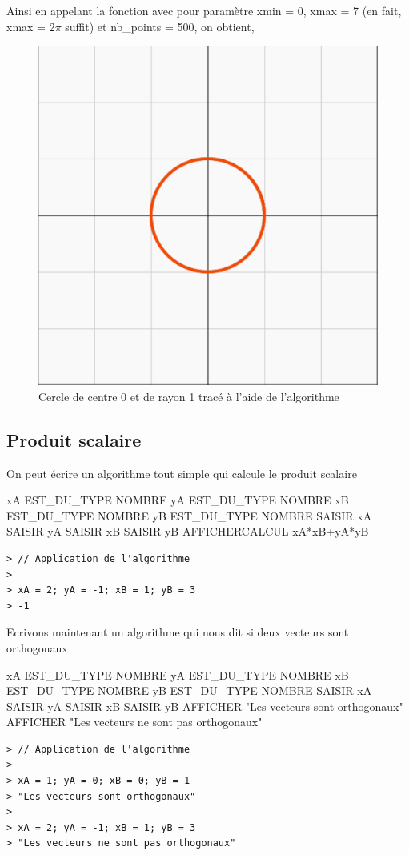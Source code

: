 Ainsi en appelant la fonction avec pour paramètre xmin = 0, xmax = 7 (en fait, xmax = 2$\pi$ suffit) et nb\_points = 500, on obtient, 
\begin{figure}[H]
\centering
\includegraphics[scale=0.5]{images/cercle_trigo.png}
\caption{Cercle de centre 0 et de rayon 1 tracé à l'aide de l'algorithme}
\end{figure}
\subsection{Produit scalaire}
On peut écrire un algorithme tout simple qui calcule le produit scalaire
\begin{algobox}
\Variables
\Ligne xA EST\_DU\_TYPE NOMBRE
\Ligne yA EST\_DU\_TYPE NOMBRE
\Ligne xB EST\_DU\_TYPE NOMBRE
\Ligne yB EST\_DU\_TYPE NOMBRE
\DebutAlgo
\Ligne SAISIR xA
\Ligne SAISIR yA
\Ligne SAISIR xB
\Ligne SAISIR yB
\Ligne AFFICHERCALCUL xA*xB+yA*yB
\FinAlgo
\end{algobox}
\begin{verbatim}
> // Application de l'algorithme
>
> xA = 2; yA = -1; xB = 1; yB = 3
> -1
\end{verbatim}
Ecrivons maintenant un algorithme qui nous dit si deux vecteurs sont orthogonaux
\begin{algobox}
\Variables
\Ligne xA EST\_DU\_TYPE NOMBRE
\Ligne yA EST\_DU\_TYPE NOMBRE
\Ligne xB EST\_DU\_TYPE NOMBRE
\Ligne yB EST\_DU\_TYPE NOMBRE
\DebutAlgo
\Ligne SAISIR xA
\Ligne SAISIR yA
\Ligne SAISIR xB
\Ligne SAISIR yB
\DebutSi
\Ligne AFFICHER "Les vecteurs sont orthogonaux"
\FinSi
\Sinon
\DebutSinon
\Ligne AFFICHER "Les vecteurs ne sont pas orthogonaux"
\FinSinon
\FinAlgo
\end{algobox}
\begin{verbatim}
> // Application de l'algorithme
>
> xA = 1; yA = 0; xB = 0; yB = 1
> "Les vecteurs sont orthogonaux"
> 
> xA = 2; yA = -1; xB = 1; yB = 3
> "Les vecteurs ne sont pas orthogonaux"
\end{verbatim}
